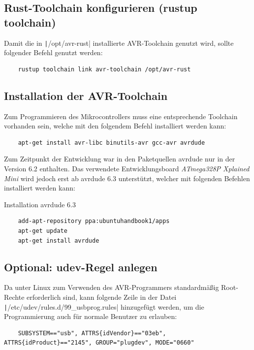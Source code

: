 \documentclass
[ 12pt,
  parskip=half %
]{scrreprt}
\newenvironment{mylisting}[1][H]
{\captionsetup{aboveskip=-0.2\normalbaselineskip}\begin{listing}[#1]}
	{\end{listing}}
\begin{document}
\subsection{Rust-Toolchain konfigurieren (rustup toolchain)}

Damit die in \texttt|/opt/avr-rust| installierte AVR-Toolchain genutzt wird, sollte folgender Befehl genutzt werden:
\begin{verbatim}
	rustup toolchain link avr-toolchain /opt/avr-rust
\end{verbatim}

\subsection{Installation der AVR-Toolchain}

Zum Programmieren des Mikrocontrollers muss eine entsprechende Toolchain vorhanden sein, welche mit den folgendem Befehl installiert werden kann:
\begin{verbatim}
	apt-get install avr-libc binutils-avr gcc-avr avrdude
\end{verbatim}

Zum Zeitpunkt der Entwicklung war in den Paketquellen avrdude nur in der Version 6.2 enthalten. Das verwendete Entwicklungsboard \textit{ATmega328P Xplained Mini} wird jedoch erst ab avrdude 6.3 unterstützt, welcher mit folgenden Befehlen installiert werden kann:
\begin{mylisting}[H]
	\caption{Installation avrdude 6.3}
	\begin{verbatim}
	add-apt-repository ppa:ubuntuhandbook1/apps
	apt-get update
	apt-get install avrdude
	\end{verbatim}
\end{mylisting}

\subsection{Optional: udev-Regel anlegen}

Da unter Linux zum Verwenden des AVR-Programmers standardmäßig Root-Rechte erforderlich sind, kann folgende Zeile in der Datei \texttt|/etc/udev/rules.d/99_usbprog.rules| hinzugefügt werden, um die Programmierung auch für normale Benutzer zu erlauben:
\begin{verbatim}
	SUBSYSTEM=="usb", ATTRS{idVendor}=="03eb", ATTRS{idProduct}=="2145", GROUP="plugdev", MODE="0660"
\end{verbatim}
\end{document}
